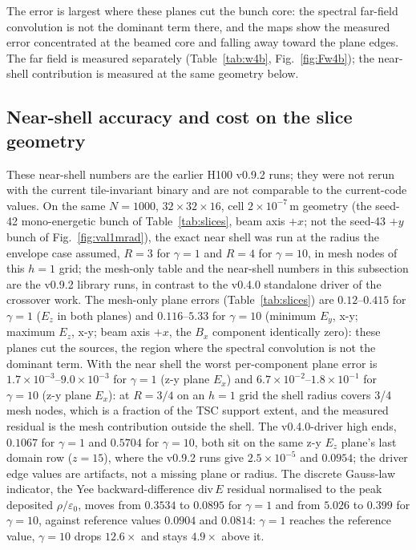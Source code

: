 The error is largest where these planes cut the bunch core: the spectral
far-field convolution is not the dominant term there, and the maps show the
measured error concentrated at the beamed core and falling away toward the
plane edges. The far field is measured separately
(Table~\ref{tab:w4b}, Fig.~\ref{fig:Fw4b}); the near-shell contribution
is measured at the same geometry below.

\subsection{Near-shell accuracy and cost on the slice geometry}
\label{app:slices-runs}

These near-shell numbers are the earlier H100 v0.9.2 runs; they were not
rerun with the current tile-invariant binary and are not comparable to the
current-code values.  On the same $N=1000$, $32\times32\times16$, cell
$2\times10^{-7}$\,m geometry (the seed-42 mono-energetic bunch of
Table~\ref{tab:slices},
beam axis $+x$; not the seed-43 $+y$ bunch of
Fig.~\ref{fig:val1mrad}), the exact near shell was run at the radius the
envelope case
assumed, $R=3$ for $\gamma=1$ and $R=4$ for $\gamma=10$, in mesh nodes of
this $h=1$ grid; the mesh-only table and the near-shell numbers in this
subsection are the v0.9.2 library runs, in contrast to the v0.4.0
standalone driver of the crossover work. The mesh-only plane errors
(Table~\ref{tab:slices}) are $0.12$--$0.415$ for $\gamma=1$
($E_z$ in both planes) and $0.116$--$5.33$ for $\gamma=10$ (minimum $E_y$,
x-y; maximum $E_z$, x-y; beam axis $+x$, the $B_x$ component identically
zero): these planes cut the sources, the region
where the spectral convolution is not the dominant term. With the near
shell the worst per-component plane error is
$1.7\times10^{-3}$--$9.0\times10^{-3}$ for $\gamma=1$ (z-y plane $E_x$) and
$6.7\times10^{-2}$--$1.8\times10^{-1}$ for $\gamma=10$ (z-y plane $E_x$):
at $R=3/4$ on an $h=1$ grid the shell radius covers 3/4 mesh
nodes, which is a fraction of the TSC support extent, and the measured
residual is the mesh contribution outside the shell. The v0.4.0-driver
high ends, $0.1067$ for $\gamma=1$ and $0.5704$ for
$\gamma=10$, both sit on the same z-y $E_z$ plane's last domain row
($z=15$), where the v0.9.2 runs give $2.5\times10^{-5}$ and $0.0954$; the
driver edge values are artifacts, not a missing plane or
radius. The discrete
Gauss-law indicator, the Yee backward-difference $\mathrm{div}\,E$ residual
normalised to the peak deposited $\rho/\varepsilon_0$, moves from $0.3534$
to $0.0895$ for $\gamma=1$ and from $5.026$ to $0.399$ for $\gamma=10$,
against reference values $0.0904$ and $0.0814$: $\gamma=1$ reaches the
reference value, $\gamma=10$ drops $12.6\times$ and stays $4.9\times$
above it.

